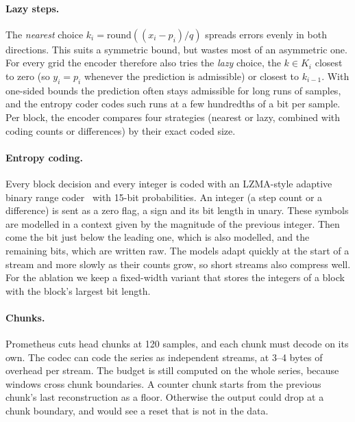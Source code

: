 \paragraph{Lazy steps.} The \emph{nearest} choice
$k_i = \mathrm{round}((x_i - p_i)/q)$ spreads errors evenly in both
directions. This suits a symmetric bound, but wastes most of an asymmetric
one. For every grid the encoder therefore also tries the \emph{lazy}
choice, the $k \in K_i$ closest to zero (so $y_i = p_i$ whenever the
prediction is admissible) or closest to $k_{i-1}$. With one-sided bounds
the prediction often stays admissible for long runs of samples, and the
entropy coder codes such runs at a few hundredths of a bit per sample. Per
block, the encoder compares four strategies (nearest or lazy, combined
with coding counts or differences) by their exact coded size.

\paragraph{Entropy coding.} Every block decision and every integer is
coded with an LZMA-style adaptive binary range coder~\cite{martin1979range}
with 15-bit probabilities. An integer (a step count or a difference) is
sent as a zero flag, a sign and its bit length in unary. These symbols are
modelled in a context given by the magnitude of the previous integer.
Then come the bit just below the leading one, which is also modelled, and
the remaining bits, which are written raw. The models adapt quickly at the
start of a stream and more slowly as their counts grow, so short streams
also compress well. For the ablation we keep a fixed-width variant that
stores the integers of a block with the block's largest bit length.

\paragraph{Chunks.} Prometheus cuts head chunks at 120 samples, and each
chunk must decode on its own. The codec can code the series as
independent streams, at 3--4 bytes of overhead per stream. The budget is
still computed on the whole series, because windows cross chunk
boundaries. A counter chunk starts from the previous chunk's last
reconstruction as a floor. Otherwise the output could drop at a chunk
boundary, and  would see a reset that is not in the data.

